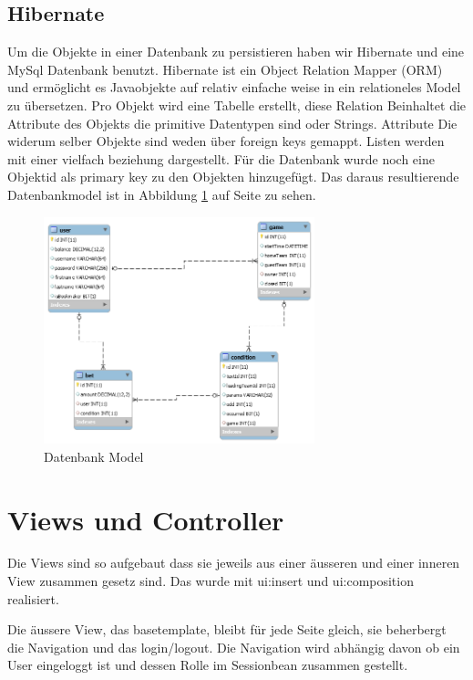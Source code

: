 \documentclass[a4paper, abstracton]{scrartcl}
\begin{document}
\subsection{Hibernate}
  Um die Objekte in einer Datenbank zu persistieren haben wir Hibernate und eine
  MySql Datenbank benutzt. Hibernate ist ein Object Relation Mapper (ORM) und
  ermöglicht es Javaobjekte auf relativ einfache weise in ein relationeles
  Model zu übersetzen. Pro Objekt wird eine Tabelle erstellt, diese Relation Beinhaltet
  die Attribute des Objekts die primitive Datentypen sind oder Strings.
  Attribute Die widerum selber Objekte sind weden über foreign keys gemappt.
  Listen werden mit einer vielfach beziehung dargestellt.
  Für die Datenbank wurde noch eine Objektid als primary key zu den Objekten
  hinzugefügt.
  Das daraus resultierende Datenbankmodel ist in
  Abbildung \ref{fig:db_model} auf Seite \pageref{fig:db_model} zu sehen.


\begin{figure}[h!]
  \begin{center}
    \includegraphics[width=0.7\textwidth]{images/db_model.png}
  \end{center}
  \caption{Datenbank Model}
  \label{fig:db_model}
\end{figure}

\section{Views und Controller}

  Die Views sind so aufgebaut dass sie jeweils aus einer äusseren und einer
  inneren View zusammen gesetz sind. Das wurde mit ui:insert und ui:composition
  realisiert.
  
  Die äussere View, das basetemplate, bleibt für jede Seite gleich, sie beherbergt
  die Navigation und das login/logout. Die Navigation wird abhängig davon ob ein User eingeloggt
  ist und dessen Rolle im Sessionbean zusammen gestellt.
  
\end{document}
